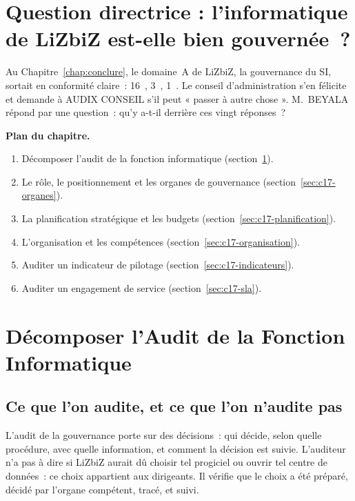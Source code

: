 \bigskip

\section*{Question directrice : l'informatique de LiZbiZ est-elle bien gouvernée~?}

Au Chapitre~\ref{chap:conclure}, le domaine~A de LiZbiZ, la gouvernance du
SI, sortait en conformité claire~: 16~\OUI{}, 3~\NON{}, 1~\NEK{}. Le conseil
d'administration s'en félicite et demande à AUDIX CONSEIL s'il peut
« passer à autre chose ». M.~BEYALA répond par une question~: qu'y a-t-il
derrière ces vingt réponses~?

\medskip
\textbf{Plan du chapitre.}
\begin{enumerate}
    \item Décomposer l'audit de la fonction informatique (section~\ref{sec:c17-decomposer}).
    \item Le rôle, le positionnement et les organes de gouvernance (section~\ref{sec:c17-organes}).
    \item La planification stratégique et les budgets (section~\ref{sec:c17-planification}).
    \item L'organisation et les compétences (section~\ref{sec:c17-organisation}).
    \item Auditer un indicateur de pilotage (section~\ref{sec:c17-indicateurs}).
    \item Auditer un engagement de service (section~\ref{sec:c17-sla}).
\end{enumerate}

\separateur

\section{Décomposer l'Audit de la Fonction Informatique}
\label{sec:c17-decomposer}

\subsection{Ce que l'on audite, et ce que l'on n'audite pas}

L'audit de la gouvernance porte sur des décisions~: qui décide, selon
quelle procédure, avec quelle information, et comment la décision est
suivie. L'auditeur n'a pas à dire si LiZbiZ aurait dû choisir tel
progiciel ou ouvrir tel centre de données~: ce choix appartient aux
dirigeants. Il vérifie que le choix a été préparé, décidé par l'organe
compétent, tracé, et suivi.

